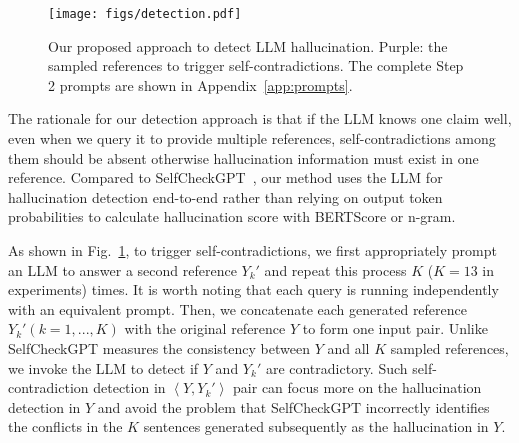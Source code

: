 \begin{figure}[h]
\centering
    \texttt{[image: figs/detection.pdf]}
    \caption{Our proposed approach to detect LLM hallucination.  \color{cyan!75!magenta}{Blue}\color{black}{: the claim from fact-checking dataset. }\color{red!80!black}{Red}
    \color{black}{: the response need to be detected whether exists hallucination.} \textcolor{purple!60!blue}{Purple}: the sampled references to trigger self-contradictions. The complete Step 2 prompts are shown in Appendix~\ref{app:prompts}.}
    \label{fig:detection}
\end{figure}

The rationale for our detection approach is that if the LLM knows one claim well, even when we query it to provide multiple references, self-contradictions among them should be absent otherwise hallucination information must exist in one reference. Compared to SelfCheckGPT~\citep{selfcheckgpt}, our method uses the LLM for hallucination detection end-to-end rather than relying on output token probabilities to calculate hallucination score with BERTScore or n-gram. 

As shown in Fig.~\ref{fig:detection}, to trigger self-contradictions, we first appropriately prompt an LLM to answer a second reference $Y_k'$ and repeat this process $K$ ($K=13$ in experiments) times. It is worth noting that each query is running independently with an equivalent prompt. %
Then, we concatenate each generated reference $Y_k' (k=1,...,K)$ with the original reference $Y$ to form one input pair. 
Unlike SelfCheckGPT measures the consistency between $Y$ and all $K$ sampled references, we invoke the LLM to detect if $Y$ and $Y_k'$ are contradictory.
Such self-contradiction detection in $\left \langle Y,Y_k'\right\rangle$ pair can focus more on the hallucination detection in $Y$ and avoid the problem that SelfCheckGPT incorrectly identifies the conflicts in the $K$ sentences generated subsequently as the hallucination in $Y$.


